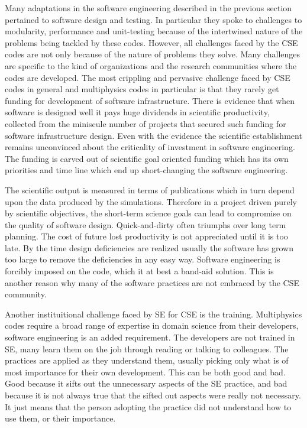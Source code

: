 
\label{sec:instChallenges}
Many adaptations in the software engineering described in the previous
section pertained to software design and testing. In particular they
spoke to challenges to modularity, performance and unit-testing because of the
intertwined nature of the problems being tackled by these
codes. However, all challenges faced by the CSE codes are not only
because of the nature of problems they solve. Many challenges are
specific to the kind of organizations and the research communities
where the codes are developed. The most crippling and pervasive
challenge faced by CSE codes in general and multiphysics codes in
particular is that they rarely get funding for development of software
infrastructure. There is evidence that when software is designed well
it pays huge dividends in scientific productivity, collected from the
miniscule number of projects that secured such funding for software
infrastructure design. Even with the evidence the scientific
establishment remains unconvinced about the criticality of investment
in software engineering. The funding is carved out of scientific goal
oriented funding which has its own priorities and time line which end
up short-changing the software engineering.


The scientific output is measured in terms of publications which in
turn depend upon the data produced by the simulations. Therefore in a
project driven purely by scientific objectives, the short-term science
goals can lead to compromise on the quality of software
design. Quick-and-dirty often triumphs over long term planning. The
cost of future lost productivity is not appreciated until it is too
late. By the time design deficiencies are realized usually the
software has grown too large to remove the deficiencies in any easy
way.  Software engineering is forcibly imposed on the code, which it
at best a band-aid solution. This is another reason why many of the
software practices are not embraced by the CSE community. 

Another instituitional challenge faced by SE for CSE is the
training. Multiphysics codes require a broad range of expertise in
domain science from their developers, software engineering is an added
requirement. The developers are not trained in SE, many learn them on
the job through reading or talking to colleagues. The practices are
applied as they understand them, usually picking only what is of most
importance for their own development. This can be both good and
bad. Good because it sifts out the unnecessary aspects of the SE
practice, and bad because it is not always true that the sifted out
aspects were really not necessary. It just means that the person
adopting the practice did not understand how to use them, or their
importance. 

